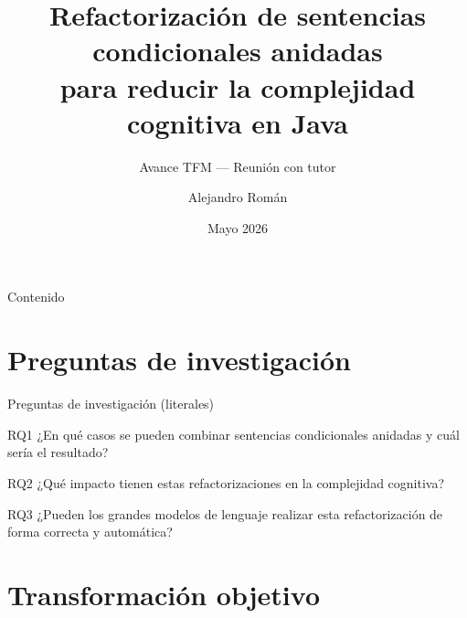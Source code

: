 \documentclass[aspectratio=169, 10pt]{beamer}
\title[Refactorización de Condicionales]{%
  Refactorización de sentencias condicionales anidadas\\
  para reducir la complejidad cognitiva en Java}
\subtitle{Avance TFM --- Reunión con tutor}
\author{Alejandro Román}
\date{Mayo 2026}
\begin{document}
\begin{frame}
  \titlepage
\end{frame}

\begin{frame}{Contenido}
  \tableofcontents
\end{frame}

\section{Preguntas de investigación}

\begin{frame}{Preguntas de investigación (literales)}
  \begin{block}{RQ1}
    ¿En qué casos se pueden combinar sentencias condicionales anidadas
    y cuál sería el resultado?
  \end{block}
  \begin{block}{RQ2}
    ¿Qué impacto tienen estas refactorizaciones en la complejidad cognitiva?
  \end{block}
  \begin{block}{RQ3}
    ¿Pueden los grandes modelos de lenguaje realizar esta refactorización
    de forma correcta y automática?
  \end{block}
\end{frame}

\section{Transformación objetivo}
\end{document}
